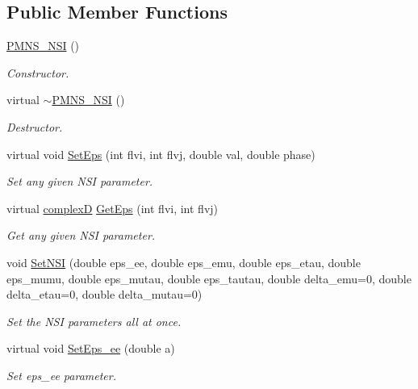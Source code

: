 \subsection*{Public Member Functions}
\begin{DoxyCompactItemize}
\item 
\hyperlink{classOscProb_1_1PMNS__NSI_ab41e79fb427c7a5662443acad31ce7e9}{P\+M\+N\+S\+\_\+\+N\+SI} ()
\begin{DoxyCompactList}\small\item\em Constructor. \end{DoxyCompactList}\item 
virtual \hyperlink{classOscProb_1_1PMNS__NSI_aad1035cb0fb26994029c25b475ec3bde}{$\sim$\+P\+M\+N\+S\+\_\+\+N\+SI} ()
\begin{DoxyCompactList}\small\item\em Destructor. \end{DoxyCompactList}\item 
virtual void \hyperlink{classOscProb_1_1PMNS__NSI_a87c508149ea36b6de493a6817247a0ea}{Set\+Eps} (int flvi, int flvj, double val, double phase)
\begin{DoxyCompactList}\small\item\em Set any given N\+SI parameter. \end{DoxyCompactList}\item 
virtual \hyperlink{EigenPoint_8h_a67ca8e107e20610c3fff78d5e726ece0}{complexD} \hyperlink{classOscProb_1_1PMNS__NSI_a70f1c7d3d0dea3abf8ac40f856fc18ab}{Get\+Eps} (int flvi, int flvj)
\begin{DoxyCompactList}\small\item\em Get any given N\+SI parameter. \end{DoxyCompactList}\item 
void \hyperlink{classOscProb_1_1PMNS__NSI_ae8829af10bc4051e8c74c8b1bc81c88c}{Set\+N\+SI} (double eps\+\_\+ee, double eps\+\_\+emu, double eps\+\_\+etau, double eps\+\_\+mumu, double eps\+\_\+mutau, double eps\+\_\+tautau, double delta\+\_\+emu=0, double delta\+\_\+etau=0, double delta\+\_\+mutau=0)
\begin{DoxyCompactList}\small\item\em Set the N\+SI parameters all at once. \end{DoxyCompactList}\item 
virtual void \hyperlink{classOscProb_1_1PMNS__NSI_a13ecb89c4d43924d23833a9e930f50e0}{Set\+Eps\+\_\+ee} (double a)
\begin{DoxyCompactList}\small\item\em Set eps\+\_\+ee parameter. \end{DoxyCompactList}\item 

\end{DoxyCompactItemize}
